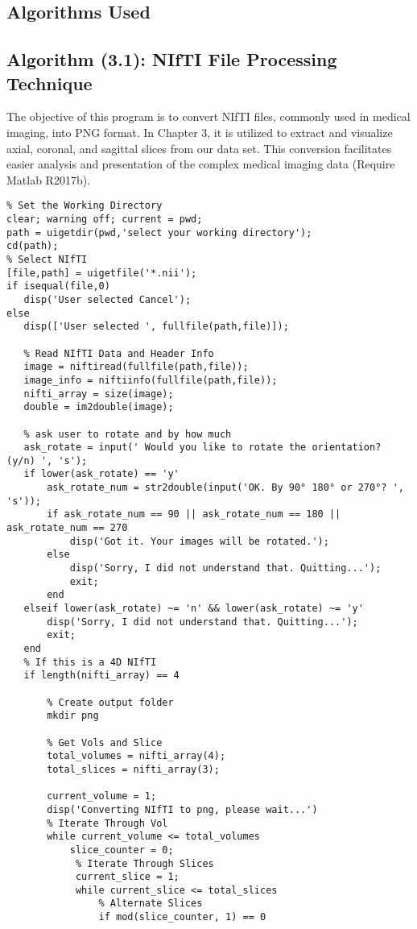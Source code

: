 \begin{appendices}
\section{Algorithms Used}
\subsection{Algorithm (3.1): NIfTI File Processing Technique}
The objective of this program is to convert NIfTI files, commonly used in medical imaging, into PNG format. In Chapter 3, it is utilized to extract and visualize axial, coronal, and sagittal slices from our data set. This conversion facilitates easier analysis and presentation of the complex medical imaging data (Require Matlab R2017b).
\\
\begin{lstlisting}
% Set the Working Directory
clear; warning off; current = pwd;
path = uigetdir(pwd,'select your working directory');
cd(path);
% Select NIfTI
[file,path] = uigetfile('*.nii');
if isequal(file,0)
   disp('User selected Cancel');
else
   disp(['User selected ', fullfile(path,file)]);

   % Read NIfTI Data and Header Info
   image = niftiread(fullfile(path,file));
   image_info = niftiinfo(fullfile(path,file));
   nifti_array = size(image);
   double = im2double(image);

   % ask user to rotate and by how much
   ask_rotate = input(' Would you like to rotate the orientation? (y/n) ', 's');
   if lower(ask_rotate) == 'y'
       ask_rotate_num = str2double(input('OK. By 90° 180° or 270°? ', 's'));
       if ask_rotate_num == 90 || ask_rotate_num == 180 || ask_rotate_num == 270
           disp('Got it. Your images will be rotated.');
       else
           disp('Sorry, I did not understand that. Quitting...');
           exit;
       end
   elseif lower(ask_rotate) ~= 'n' && lower(ask_rotate) ~= 'y'
       disp('Sorry, I did not understand that. Quitting...');
       exit;
   end
   % If this is a 4D NIfTI
   if length(nifti_array) == 4

       % Create output folder
       mkdir png

       % Get Vols and Slice
       total_volumes = nifti_array(4);
       total_slices = nifti_array(3);

       current_volume = 1;
       disp('Converting NIfTI to png, please wait...')
       % Iterate Through Vol
       while current_volume <= total_volumes
           slice_counter = 0;
            % Iterate Through Slices
            current_slice = 1;
            while current_slice <= total_slices
                % Alternate Slices
                if mod(slice_counter, 1) == 0


\end{lstlisting}
\end{appendices}

